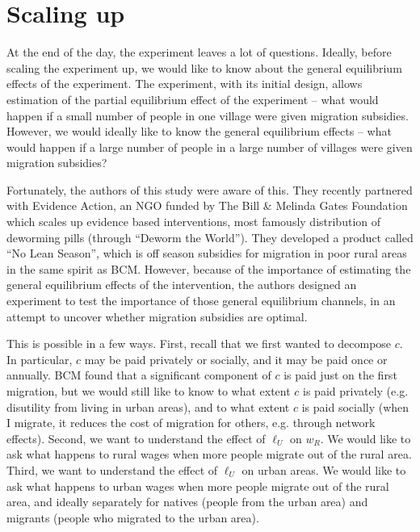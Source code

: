 \documentclass[12pt,english]{article}
\begin{document}
\section{Scaling up}

At the end of the day, the experiment leaves a lot of questions. Ideally, before scaling the experiment up, we would like to know about the general equilibrium effects of the experiment. The experiment, with its initial design, allows estimation of the partial equilibrium effect of the experiment -- what would happen if a small number of people in one village were given migration subsidies. However, we would ideally like to know the general equilibrium effects -- what would happen if a large number of people in a large number of villages were given migration subsidies?

Fortunately, the authors of this study were aware of this. They recently partnered with Evidence Action, an NGO funded by The Bill \& Melinda Gates Foundation which scales up evidence based interventions, most famously distribution of deworming pills (through ``Deworm the World''). They developed a product called ``No Lean Season'', which is off season subsidies for migration in poor rural areas in the same spirit as BCM. However, because of the importance of estimating the general equilibrium effects of the intervention, the authors designed an experiment to test the importance of those general equilibrium channels, in an attempt to uncover whether migration subsidies are optimal.

This is possible in a few ways. First, recall that we first wanted to decompose $c$. In particular, $c$ may be paid privately or socially, and it may be paid once or annually. BCM found that a significant component of $c$ is paid just on the first migration, but we would still like to know to what extent $c$ is paid privately (e.g. disutility from living in urban areas), and to what extent $c$ is paid socially (when I migrate, it reduces the cost of migration for others, e.g. through network effects). Second, we want to understand the effect of $\ell_{U}$ on $w_{R}$. We would like to ask what happens to rural wages when more people migrate out of the rural area. Third, we want to understand the effect of $\ell_{U}$ on urban areas. We would like to ask what happens to urban wages when more people migrate out of the rural area, and ideally separately for natives (people from the urban area) and migrants (people who migrated to the urban area).
\end{document}

